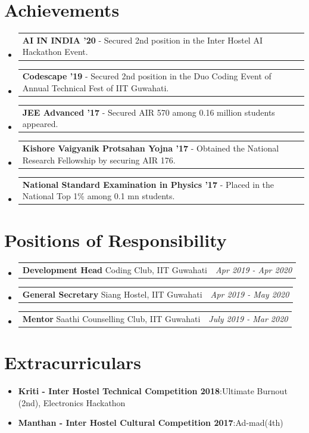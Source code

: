 \documentclass[a4paper,11pt]{article}
\makeatletter
\newcommand{\resumeItem}[2]{
  \item{
    \textbf{#1}{:\hspace{0.5mm}#2 \vspace{-0.5mm}}
  }
}
\newcommand{\resumePOR}[3]{
\vspace{0.5mm}\item
    \begin{tabular*}{0.97\textwidth}[t]{l@{\extracolsep{\fill}}r}
        \textbf{#1}\hspace{0.3mm}#2 & \textit{\small{#3}} 
    \end{tabular*}
    \vspace{-2mm}
}
\newcommand{\resumeSubItem}[2]{\resumeItem{#1}{#2}\vspace{-4pt}}
\newcommand{\resumeSubHeadingListStart}{\begin{itemize}[leftmargin=*,labelsep=0mm]}
\newcommand{\resumeHeadingSkillStart}{\begin{itemize}[leftmargin=*,itemsep=1.7mm, rightmargin=2ex]}
\newcommand{\resumeSubHeadingListEnd}{\end{itemize}\vspace{2mm}}
\newcommand{\resumeHeadingSkillEnd}{\end{itemize}\vspace{-2mm}}
\makeatother
\begin{document}
\vspace{-5mm}
\section{Achievements}
\vspace{-0.2mm}
\resumeSubHeadingListStart
\resumePOR{AI IN INDIA '20} %
    { - Secured 2nd position in the Inter Hostel AI Hackathon Event. } %
    {} %
\resumePOR{Codescape '19} %
    { - Secured 2nd position in the Duo Coding Event of Annual Technical Fest of IIT Guwahati.} %
    {} %
\resumePOR{JEE Advanced '17} %
    { - Secured AIR 570 among 0.16 million students appeared.} %
    {} %
\resumePOR{Kishore Vaigyanik Protsahan Yojna '17} %
    { - Obtained the National Research Fellowship by securing AIR 176.} %
    {} %
\resumePOR{National Standard Examination in Physics '17} %
    { - Placed in the National Top 1\% among 0.1 mn students.} %
    {} %

\resumeSubHeadingListEnd
\vspace{-5mm}
\section{Positions of Responsibility}
\vspace{-0.4mm}
\resumeSubHeadingListStart
\resumePOR{Development Head} %
    { Coding Club, IIT Guwahati} %
    {Apr 2019 - Apr 2020} %
\resumePOR{General Secretary} %
    { Siang Hostel, IIT Guwahati} %
    {Apr 2019 - May 2020} %
\resumePOR{Mentor} %
    { Saathi Counselling Club, IIT Guwahati} %
    {July 2019 - Mar 2020} %

\vspace{-5mm}
\resumeSubHeadingListEnd
\section{Extracurriculars}
\resumeHeadingSkillStart
\resumeSubItem{Kriti - Inter Hostel Technical Competition 2018}
 {Ultimate Burnout (2nd), Electronics Hackathon}
 \resumeSubItem{Manthan - Inter Hostel Cultural Competition 2017} %
    {Ad-mad(4th)}
 \resumeHeadingSkillEnd
\vspace{-4mm}


\end{document}
